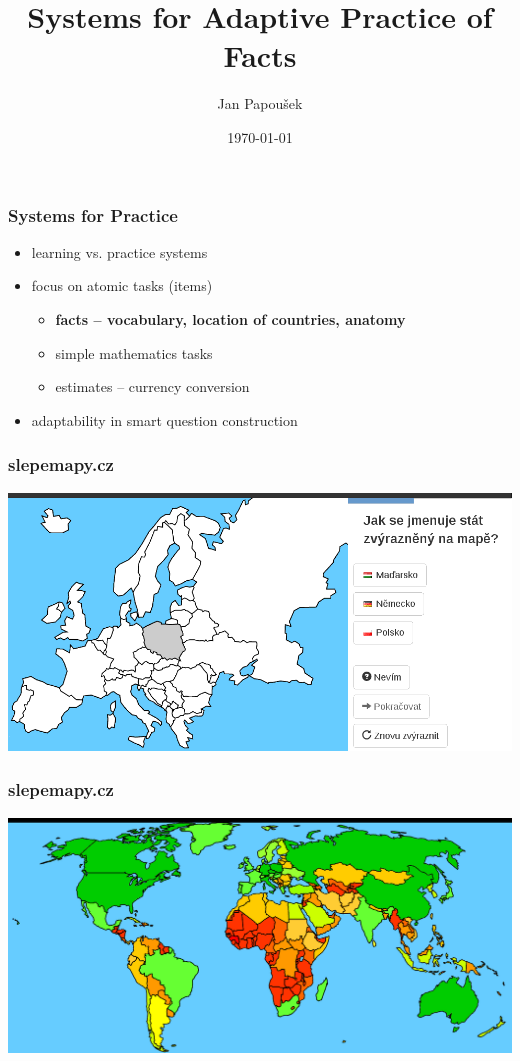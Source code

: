 \documentclass[xcolor=svgnames]{beamer}
\title{Systems for Adaptive Practice of Facts}
\author{Jan Papou\v{s}ek}
\institute{Masaryk University Brno}
\date{\today}
\begin{document}
\frame[plain]{\titlepage}
\begin{frame}
	\frametitle{Systems for Practice}
	\begin{itemize}
		\item learning vs. practice systems
		\item focus on atomic tasks (items)
		\begin{itemize}
			\item \textbf{facts -- vocabulary, location of countries, anatomy}
			\item simple mathematics tasks
			\item estimates -- currency conversion
		\end{itemize}
		\item adaptability in smart question construction
	\end{itemize}
\end{frame}
\begin{frame}
	\frametitle{slepemapy.cz}
	\begin{center}
		\includegraphics[width=\textwidth]{practice-example-cs.png}
	\end{center}
\end{frame}
\begin{frame}
	\frametitle{slepemapy.cz}
	\begin{center}
		\includegraphics[width=\textwidth]{knowledge-map.png}
	\end{center}
\end{frame}
\end{document}
